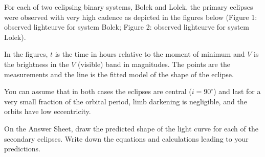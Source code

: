 For each of two eclipsing binary systems, Bolek and Lolek, the primary
eclipses were observed with very high cadence as depicted in the figures
below (Figure 1: observed lightcurve for system Bolek; Figure 2: observed
lightcurve for system Lolek).

In the figures, $t$ is the time in hours relative to the moment of minimum
and $V$ is the brightness in the $V$ (visible) band in magnitudes. The points
are the measurements and the line is the fitted model of the shape of the
eclipse.

You can assume that in both cases the eclipses are central ($i = 90^\circ$)
and last for a very small fraction of the orbital period, limb darkening is
negligible, and the orbits have low eccentricity.

On the Answer Sheet, draw the predicted shape of the light curve for each of
the secondary eclipses. Write down the equations and calculations leading to
your predictions.
